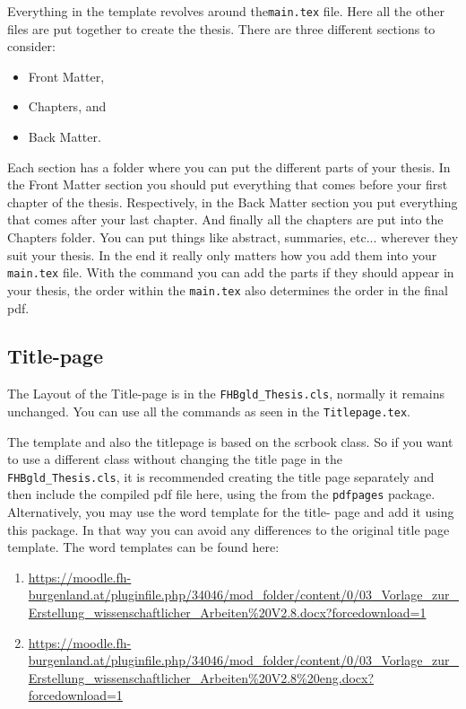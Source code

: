 Everything in the template revolves around the\verb|main.tex| file. Here all the other files are put together to create the thesis.
There are three different sections to consider: 
\begin{itemize}
	\item Front Matter,
	\item Chapters, and
	\item Back Matter.
\end{itemize}
Each section has a folder where you can put the different parts of your thesis. In the Front Matter section you should put everything that comes before your first chapter of the thesis. Respectively, in the Back Matter section you put everything that comes after your last chapter. And finally all the chapters are put into the Chapters folder. You can put things like abstract, summaries, etc... wherever they suit your thesis. In the end it really only matters how you add them into your \verb|main.tex| file. With the \verb|| command you can add the parts if they should appear in your thesis, the order within the \verb|main.tex| also determines the order in the final pdf.

\subsection{Title-page}
The Layout of the Title-page is in the \verb|FHBgld_Thesis.cls|, normally it remains unchanged. You can use all the commands as seen in the \verb|Titlepage.tex|. 

The template and also the titlepage is based on the scrbook class. So if you want to use a different class without changing the title page in the \verb|FHBgld_Thesis.cls|, it is recommended creating the title page separately and then include the compiled pdf file here, using the 
\verb|| from the \verb|pdfpages| package. Alternatively, you may use the word template for the title- page and add it using this package. In that way you can avoid any differences to the original title page template. The word templates can be found here:
\begin{enumerate}
	\item \url{https://moodle.fh-burgenland.at/pluginfile.php/34046/mod_folder/content/0/03_Vorlage_zur_Erstellung_wissenschaftlicher_Arbeiten\%20V2.8.docx?forcedownload=1}
	\item \url{https://moodle.fh-burgenland.at/pluginfile.php/34046/mod_folder/content/0/03_Vorlage_zur_Erstellung_wissenschaftlicher_Arbeiten\%20V2.8\%20eng.docx?forcedownload=1}
\end{enumerate}

